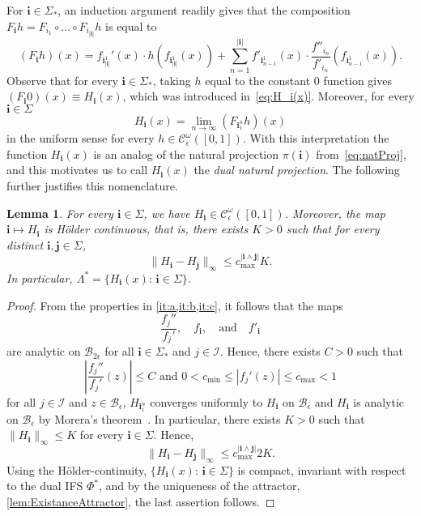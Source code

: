 \documentclass[11pt,]{article}
\def\cref#1{\ref{#1}}%
\newtheorem{lemma}[theorem]{Lemma}
\theoremstyle{definition}
\theoremstyle{remark}
\newcommand{\0}{\mathbf{0}}
\newcommand{\bi}{\mathbf{i}}
\newcommand{\bj}{\mathbf{j}}
\numberwithin{equation}{section}
\begin{document}
For $\bi\in\Sigma_*$, an induction argument readily gives that the composition
$F_{\bi}h=F_{i_1}\circ\ldots\circ F_{i_{|\bi|}}h$ is equal to
\begin{equation*}%
	(F_{\bi}h)(x) = f_{\bi_{|\bi|}^1}'(x)\cdot h(f_{\bi_{|\bi|}^1}(x)) + \sum_{n=1}^{|\bi|}
	f'_{\bi_{n-1}^1}(x) \cdot 
	\frac{f''_{i_n}}{f'_{i_n}}(f_{\bi_{n-1}^1}(x)).
\end{equation*}
Observe that for every $\bi\in\Sigma_*$, taking $h$ equal to the constant $0$ function gives
$(F_{\bi}0)(x)\equiv H_{\bi}(x)$, which was introduced
in~\cref{eq:H_i(x)}. Moreover, for every $\bi\in\Sigma$
\begin{equation*}%
	H_{\bi}(x)=\lim_{n\to\infty}(F_{\bi_1^n}h)(x)
\end{equation*}
in the uniform sense for every $h\in\mathcal{C}_\epsilon^\omega([0,1])$. With this interpretation
the function $H_{\bi}(x)$ is an analog of the natural projection $\pi(\bi)$ from~\cref{eq:natProj},
and this motivates us to call $H_{\bi}(x)$ the \emph{dual natural projection}. The following 
further justifies this nomenclature.
\begin{lemma}\label{thm:H_iAnalytic}
	For every $\bi\in\Sigma$, we have $H_{\bi}\in\mathcal{C}_\epsilon^{\omega}([0,1])$.
	Moreover, the map $\bi\mapsto H_{\bi}$ is H\"older continuous, that is, there exists $K>0$
	such that for every distinct $\bi,\bj\in\Sigma$,
	\begin{equation*}%
		\|H_{\bi}-H_{\bj}\|_\infty\leq c_{\max}^{|\bi\wedge\bj|}K.
	\end{equation*}
	In particular, $\Lambda^*=\{H_{\bi}(x):\, \bi\in\Sigma\}$.
\end{lemma}

\begin{proof}
 From the properties in \cref{it:a,it:b,it:c}, it follows that the maps
 \[
 \frac{f_j''}{f_j'},\quad f_{\bi}, \quad\text{and} \quad f'_{\bi}
 \]
 are analytic on $\mathcal{B}_{2\epsilon}$ for all $\bi\in\Sigma_*$ and $j\in\mathcal{I}$. Hence,
 there exists $C>0$ such that
	\[
	\left|\frac{f_j''}{f_j'}(z)\right| \leq C\text{ and }0<c_{\min}\leq|f_j'(z)|\leq c_{\max}<1
	\]
	for all $j\in\mathcal{I}$ and $z\in\mathcal{B}_{\epsilon}$, $H_{\bi_1^n}$ converges
	uniformly to $H_{\bi}$ on $\mathcal{B}_{\epsilon}$ and $H_{\bi}$ is analytic on
	$\mathcal{B}_{\epsilon}$ by Morera's theorem~\cite[Theorem 10.17]{Rudin_AnalysisBook}. In
	particular, there exists $K>0$ such that $\|H_{\bi}\|_\infty\leq K$ for every
	$\bi\in\Sigma$. Hence, $$
	\|H_{\bi}-H_{\bj}\|_\infty\leq c_{\max}^{|\bi\wedge\bj|}2K.
	$$
	Using the H\"older-continuity, $\{H_{\bi}(x):\, \bi\in\Sigma\}$ is compact, invariant with
	respect to the dual IFS $\Phi^*$, and by the uniqueness of the attractor,
	\cref{lem:ExistanceAttractor}, the last assertion follows.
\end{proof}
\end{document}
